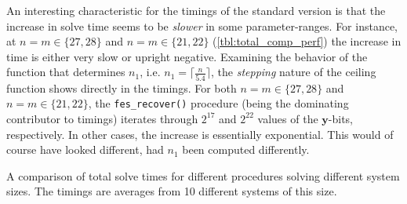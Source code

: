 An interesting characteristic for the timings of the standard version is that the increase in solve time seems to be \textit{slower} in some parameter-ranges. For instance, at $n = m \in \{27, 28\}$ and $n = m \in \{21,22\}$ (\cref{tbl:total_comp_perf}) the increase in time is either very slow or upright negative. Examining the behavior of the function that determines $n_1$, i.e. $n_1 = \lceil \frac{n}{5.4} \rceil$, the \textit{stepping} nature of the ceiling function shows directly in the timings. For both $n = m \in \{27, 28\}$ and $n = m \in \{21,22\}$, the \texttt{fes\_recover()} procedure (being the dominating contributor to timings) iterates through $2^{17}$ and $2^{22}$ values of the $\mathbf{y}$-bits, respectively. In other cases, the increase is essentially exponential. This would of course have looked different, had $n_1$ been computed differently.

\begin{table}[t]
    \begin{center}
    \end{center}
    \caption{A comparison of total solve times for different procedures solving different system sizes. The timings are averages from 10 different systems of this size.} \label{tbl:total_comp_perf}
\end{table}

